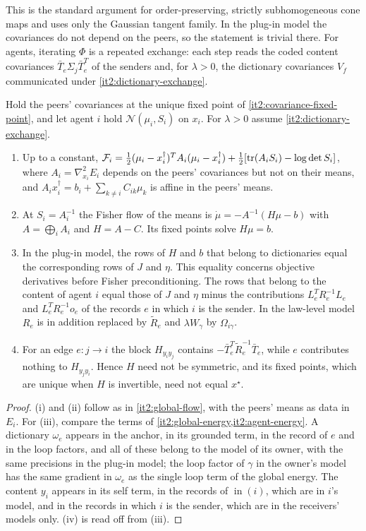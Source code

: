 This is the standard argument for order-preserving, strictly subhomogeneous cone maps and uses only the Gaussian tangent family. In the plug-in model the covariances do not depend on the peers, so the statement is trivial there. For agents, iterating $\Phi$ is a repeated exchange: each step reads the coded content covariances $\bar T_e\Sigma_j\bar T_e^T$ of the senders and, for $\lambda>0$, the dictionary covariances $V_f$ communicated under \cref{it2:dictionary-exchange}.

Hold the peers' covariances at the unique fixed point of \cref{it2:covariance-fixed-point}, and let agent $i$ hold $\mathcal N(\mu_i,S_i)$ on $x_i$. For $\lambda>0$ assume \cref{it2:dictionary-exchange}.
\begin{enumerate}
\item[(i)] Up to a constant, $\mathcal F_i=\frac12(\mu_i-x_i^\dagger)^TA_i(\mu_i-x_i^\dagger)+\frac12[\operatorname{tr}(A_iS_i)-\log\det S_i]$, where $A_i=\nabla^2_{x_i}E_i$ depends on the peers' covariances but not on their means, and $A_ix_i^\dagger=b_i+\sum_{k\neq i}C_{ik}\mu_k$ is affine in the peers' means.
\item[(ii)] At $S_i=A_i^{-1}$ the Fisher flow of the means is $\dot\mu=-A^{-1}(H\mu-b)$ with $A=\bigoplus_iA_i$ and $H=A-C$. Its fixed points solve $H\mu=b$.
\item[(iii)] In the plug-in model, the rows of $H$ and $b$ that belong to dictionaries equal the corresponding rows of $J$ and $\eta$. This equality concerns objective derivatives before Fisher preconditioning. The rows that belong to the content of agent $i$ equal those of $J$ and $\eta$ minus the contributions $L_e^TR_e^{-1}L_e$ and $L_e^TR_e^{-1}o_e$ of the records $e$ in which $i$ is the sender. In the law-level model $R_e$ is in addition replaced by $\tilde R_e$ and $\lambda W_\gamma$ by $\Omega_{i\gamma}$.
\item[(iv)] For an edge $e:j\to i$ the block $H_{y_iy_j}$ contains $-\bar T_e^T\tilde R_e^{-1}\bar T_e$, while $e$ contributes nothing to $H_{y_jy_i}$. Hence $H$ need not be symmetric, and its fixed points, which are unique when $H$ is invertible, need not equal $x^\star$.
\end{enumerate}
\begin{proof}
(i) and (ii) follow as in \cref{it2:global-flow}, with the peers' means as data in $E_i$. For (iii), compare the terms of \cref{it2:global-energy,it2:agent-energy}. A dictionary $\omega_e$ appears in the anchor, in its grounded term, in the record of $e$ and in the loop factors, and all of these belong to the model of its owner, with the same precisions in the plug-in model; the loop factor of $\gamma$ in the owner's model has the same gradient in $\omega_e$ as the single loop term of the global energy. The content $y_i$ appears in its self term, in the records of $\operatorname{in}(i)$, which are in $i$'s model, and in the records in which $i$ is the sender, which are in the receivers' models only. (iv) is read off from (iii).
\end{proof}

